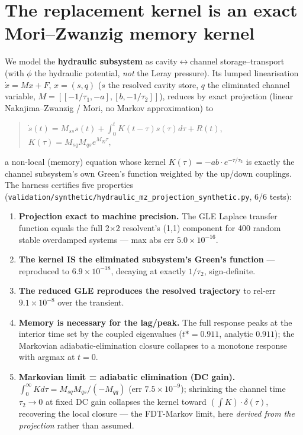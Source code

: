 \documentclass[tc, manuscript]{copernicus}
\begin{document}
\section{The replacement kernel is an exact Mori–Zwanzig memory kernel}

We model the \textbf{hydraulic subsystem} as cavity\ensuremath{\leftrightarrow}channel storage–transport (with $\phi $ the hydraulic potential, \emph{not} the Leray pressure). Its lumped linearisation $\dot{x}=Mx+F$, $x=(s,q)$ ($s$ the resolved cavity store, $q$ the eliminated channel variable, $M=[[-1/\tau _{1},-a],[b,-1/\tau _{2}]]$), reduces by exact projection (linear Nakajima–Zwanzig / Mori, no Markov approximation) to

\begin{quote}
$\dot{s}(t) = M_{ss} s(t) + \int _{0}^{t} K(t-\tau ) s(\tau ) d\tau  + R(t)$, $K(\tau ) = M_{sq} M_{qs} e^{M_{qq} \tau }$,
\end{quote}

a non-local (memory) equation whose kernel $K(\tau )=-ab\cdot e^{-\tau /\tau _{2}}$ is exactly the channel subsystem's own Green's function weighted by the up/down couplings. The harness certifies five properties (\texttt{validation/\allowbreak{}synthetic/\allowbreak{}hydraulic\_\allowbreak{}mz\_\allowbreak{}projection\_\allowbreak{}synthetic.\allowbreak{}py}, 6/6 tests):

\begin{enumerate}
\item \textbf{Projection exact to machine precision.} The GLE Laplace transfer function equals the full 2\ensuremath{\times}2 resolvent's (1,1) component for 400 random stable overdamped systems — max abs err \textbf{$5.0\times 10^{-16}$}.
\item \textbf{The kernel IS the eliminated subsystem's Green's function} — reproduced to \textbf{$6.9\times 10^{-18}$}, decaying at exactly $1/\tau _{2}$, sign-definite.
\item \textbf{The reduced GLE reproduces the resolved trajectory} to rel-err \textbf{$9.1\times 10^{-8}$} over the transient.
\item \textbf{Memory is necessary for the lag/peak.} The full response peaks at the interior time set by the coupled eigenvalues ($t*=0.911$, analytic $0.911$); the Markovian adiabatic-elimination closure collapses to a monotone response with argmax at $t=0$.
\item \textbf{Markovian limit = adiabatic elimination (DC gain).} $\int _{0}^\infty  K d\tau  = M_{sq} M_{qs}/(-M_{qq})$ (err $7.5\times 10^{-9}$); shrinking the channel time $\tau _{2}\to 0$ at fixed DC gain collapses the kernel toward $(\int K)\cdot \delta (\tau )$, recovering the local closure — the FDT-Markov limit, here \emph{derived from the projection} rather than assumed.
\end{enumerate}
\end{document}
